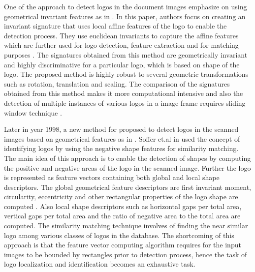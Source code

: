 \begin{itemize}
 One of the approach to detect logos in the document images emphasize on using geometrical invariant features as in \cite{doermann1993logo}. In this paper, authors focus on creating an invariant signature that uses local affine features of the logo to enable the detection process. They use euclidean invariants to capture the affine features which are further used for logo detection, feature extraction and for matching purposes \cite{doermann1993logo}. The signatures obtained from this method are geometrically invariant and highly discriminative for a particular logo, which is based on shape of the logo. The proposed method is highly robust to several geometric transformations such as rotation, translation and scaling. The comparison of the signatures obtained from this method makes it more computational intensive and also the detection of multiple instances of various logos in a image frame requires sliding window technique \cite{doermann1993logo}.
 
 Later in year 1998, a new method for proposed to detect logos in the scanned images based on geometrical features as in \cite{soffer1998using}. Soffer et.al in \cite{soffer1998using} used the concept of identifying logos by using the negative shape features for similarity matching. The main idea of this approach is to enable the detection of shapes by computing the positive and negative areas of the logo in the scanned image. Further the logo is represented as feature vectors containing both global and local shape descriptors. The global geometrical feature descriptors are first invariant moment, circularity, eccentricity and other rectangular properties of the logo shape are computed \cite{soffer1998using}. Also local shape descriptors such as horizontal gaps per total area, vertical gaps per total area and the ratio of negative area to the total area are computed. The similarity matching technique involves of finding the near similar logo among various classes of logos in the database. The shortcoming of this approach is that the feature vector computing algorithm requires for the input images to be bounded by rectangles prior to detection process, hence the task of logo localization and identification becomes an exhaustive task.    
 

\end{itemize}
